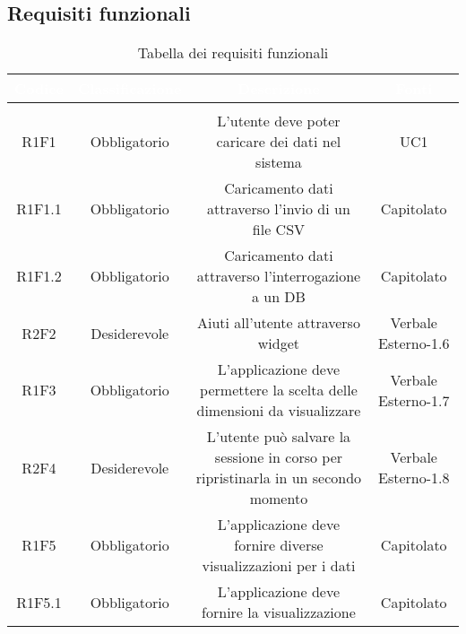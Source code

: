 \subsection{Requisiti funzionali}
\renewcommand{\arraystretch}{1.5}
\begin{center}
\begin{longtable}{C{\colA} C{\colB} C{\colC} C{\colA}}
		\textcolor{white}{\textbf{Codice}} & 
		\textcolor{white}{\textbf{Classificazione}} & 
		\textcolor{white}{\textbf{Descrizione}} & 
		\textcolor{white}{\textbf{Fonti}} \\
		\endfirsthead
	    \\
	    \endfoot
	    \caption{Tabella dei requisiti funzionali}
	    \endlastfoot

R1F1 & Obbligatorio & L'utente deve poter caricare dei dati nel sistema & UC1\\
R1F1.1 & Obbligatorio & Caricamento dati attraverso l'invio di un file CSV & Capitolato\\
R1F1.2 & Obbligatorio & Caricamento dati attraverso l'interrogazione a un DB & Capitolato\\
R2F2 & Desiderevole & Aiuti all'utente attraverso widget & Verbale Esterno-1.6 \\
R1F3 & Obbligatorio & L'applicazione deve permettere la scelta delle dimensioni da visualizzare & Verbale Esterno-1.7\\
R2F4 & Desiderevole & L'utente può salvare la sessione in corso per ripristinarla in un secondo momento & Verbale Esterno-1.8\\
R1F5 & Obbligatorio & L'applicazione deve fornire diverse visualizzazioni per i dati & Capitolato\\

R1F5.1 & Obbligatorio & L'applicazione deve fornire la visualizzazione  & Capitolato\\


\end{longtable}
\end{center}
